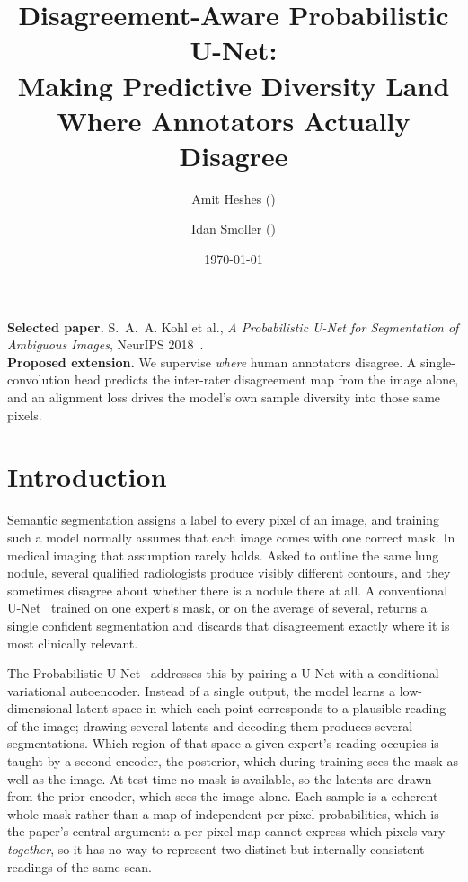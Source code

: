 \documentclass[10pt]{article}
\title{Disagreement-Aware Probabilistic U-Net:\\
\large Making Predictive Diversity Land Where Annotators Actually Disagree}
\author{Amit Heshes (\todo{ID}) \and Idan Smoller (\todo{ID})}
\date{\today}
\begin{document}
\maketitle
\vspace{-1.8em}

\begin{center}
\begin{minipage}{0.93\textwidth}\small
\textbf{Selected paper.} S.~A.~A. Kohl et al., \emph{A Probabilistic U-Net for
Segmentation of Ambiguous Images}, NeurIPS 2018~\cite{kohl2018}.\\
\textbf{Proposed extension.} We supervise \emph{where} human annotators disagree.
A single-convolution head predicts the inter-rater disagreement map from the
image alone, and an alignment loss drives the model's own sample diversity into
those same pixels.
\end{minipage}
\end{center}
\vspace{0.4em}

\section{Introduction}\label{sec:intro}

Semantic segmentation assigns a label to every pixel of an image, and training
such a model normally assumes that each image comes with one correct mask. In
medical imaging that assumption rarely holds. Asked to outline the same lung
nodule, several qualified radiologists produce visibly different contours, and
they sometimes disagree about whether there is a nodule there at all. A
conventional U-Net~\cite{ronneberger2015} trained on one expert's mask, or on the
average of several, returns a single confident segmentation and discards that
disagreement exactly where it is most clinically relevant.

The Probabilistic U-Net~\cite{kohl2018} addresses this by pairing a U-Net with a
conditional variational autoencoder. Instead of a single output, the model learns
a low-dimensional latent space in which each point corresponds to a plausible
reading of the image; drawing several latents and decoding them produces several
segmentations. Which region of that space a given expert's reading occupies is
taught by a second encoder, the posterior, which during training sees the mask as
well as the image. At test time no mask is available, so the latents are drawn
from the prior encoder, which sees the image alone. Each sample is a coherent
whole mask rather than a map of independent per-pixel probabilities, which is the
paper's central argument: a per-pixel map cannot express which pixels vary
\emph{together}, so it has no way to represent two distinct but internally
consistent readings of the same scan.
\end{document}

